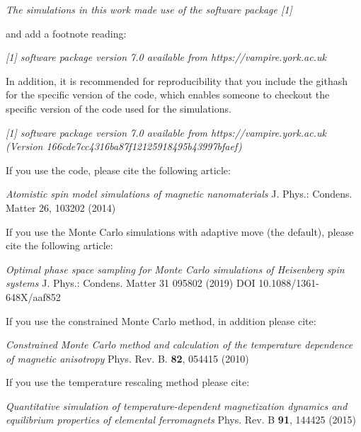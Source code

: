 \indent \textit{The simulations in this work made use of the \vampire software package [1]}

\noindent and add a footnote reading:

\indent \textit{[1] \vampire software package version 7.0 available from https://vampire.york.ac.uk}

\noindent In addition, it is recommended for reproducibility that you include the githash for the specific version of the code, which enables someone to checkout the specific version of the code used for the simulations.

\indent \textit{[1] \vampire software package version 7.0 available from https://vampire.york.ac.uk (Version 166cde7cc4316ba87f12125918495b43997bfaef)}

\noindent If you use the code, please cite the following article:

\noindent \textit{\small Atomistic spin model simulations of magnetic nanomaterials} \newline
{} \newline
{\small J. Phys.: Condens. Matter 26, 103202 (2014)}

\newpage
\noindent If you use the Monte Carlo simulations with adaptive move (the default), please cite the following article:

\noindent \textit{\small Optimal phase space sampling for Monte Carlo simulations of Heisenberg spin systems} \newline
{} \newline
{\small J. Phys.: Condens. Matter 31 095802 (2019)}
{\small DOI 10.1088/1361-648X/aaf852}

\noindent If you use the constrained Monte Carlo method, in addition please cite:

\noindent \textit{\small Constrained Monte Carlo method and calculation of the temperature dependence of magnetic anisotropy}\newline
{} \newline
{\small Phys. Rev. B. \textbf{82}, 054415 (2010)}

\noindent If you use the temperature rescaling method please cite:

\noindent \textit{\small Quantitative simulation of temperature-dependent magnetization dynamics and equilibrium properties of elemental ferromagnets} \newline
{} \newline
{\small Phys. Rev. B \textbf{91}, 144425 (2015)}

